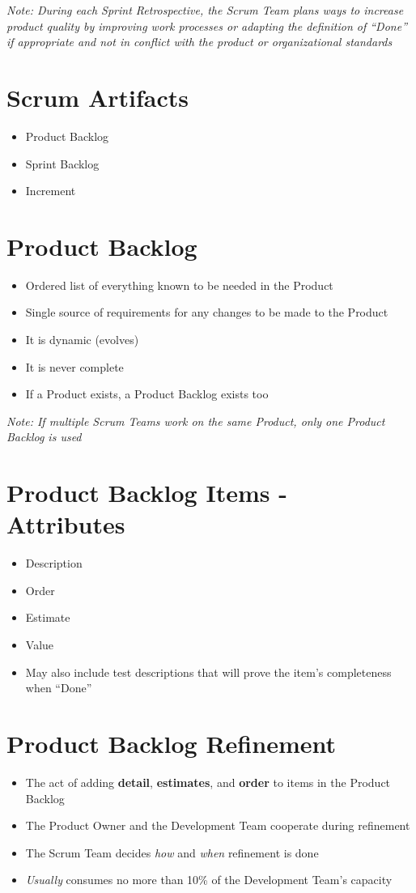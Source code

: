 \documentclass[a4paper,11pt,twocolumn]{article}
\begin{document}
\textit{Note: During each Sprint Retrospective, the Scrum Team plans ways to increase product quality by improving work processes or adapting the definition of ``Done'' if appropriate and not in conflict with the product or organizational standards}

\section*{Scrum Artifacts}
\begin{itemize}
	\item Product Backlog
	\item Sprint Backlog
	\item Increment
\end{itemize}

\section*{Product Backlog}
\begin{itemize}
	\item Ordered list of everything known to be needed in the Product
	\item Single source of requirements for any changes to be made to the Product
	\item It is dynamic (evolves)
	\item It is never complete
	\item If a Product exists, a Product Backlog exists too
\end{itemize}

\textit{Note: If multiple Scrum Teams work on the same Product, only one Product Backlog is used}

\section*{Product Backlog Items - Attributes}
\begin{itemize}
	\item Description
    \item Order
    \item Estimate
    \item Value
    \item May also include test descriptions that will prove the item's completeness when ``Done''
\end{itemize}

\section*{Product Backlog Refinement}
\begin{itemize}
	\item The act of adding \textbf{detail}, \textbf{estimates}, and \textbf{order} to items in the Product Backlog
	\item The Product Owner and the Development Team cooperate during refinement
	\item The Scrum Team decides \textit{how} and \textit{when} refinement is done
	\item \textit{Usually} consumes no more than 10\% of the Development Team's capacity
\end{itemize}
\end{document}
